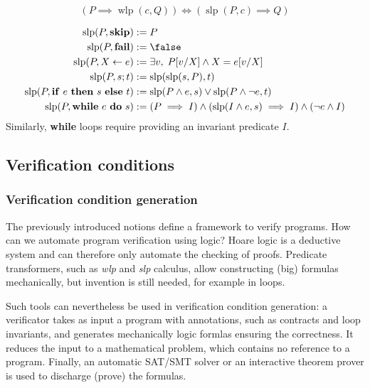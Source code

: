 \documentclass[toc]{../cs-classes/cs-classes}
\DeclareMathOperator{\wlp}{wlp}
\DeclareMathOperator{\slp}{slp}
\begin{document}
\begin{property}[Duality]
    \begin{equation*}
        (P\implies\wlp(c, Q)) \iff (\slp(P, c) \implies Q)
    \end{equation*}
\end{property}

\begin{definition}
    \begin{equation*}
        \begin{aligned}
            \slp(P, \textnormal{\bf skip}) &:= P\\
            \slp(P, \textnormal{\bf fail}) &:= \false\\
            \slp(P, X\leftarrow e) &:= \exists v, \; P[v/X] \land X=e[v/X]\\
            \slp(P, s;t) &:= \slp(\slp(s, P), t)\\
            \slp(P, \textnormal{\textbf{if} $e$ \textbf{then} $s$ \textbf{else} $t$}) &:= \slp(P\land e, s)\lor\slp(P\land\lnot e, t)\\
            \slp(P, \textnormal{\textbf{while} $e$ \textbf{do} $s$}) &:= (P\implies I)\land(\slp(I\land e, s) \implies I) \land (\lnot e\land I)
        \end{aligned}
    \end{equation*}
    Similarly, \textbf{while} loops require providing an invariant predicate $I$. 
\end{definition}

\subsection{Verification conditions}
\subsubsection{Verification condition generation}
The previously introduced notions define a framework to verify programs. How can we automate program verification using logic? Hoare logic is a deductive system and can therefore only automate the checking of proofs. Predicate transformers, such as \emph{wlp} and \emph{slp} calculus, allow constructing (big) formulas mechanically, but invention is still needed, for example in loops.

Such tools can nevertheless be used in verification condition generation: a verificator takes as input a program with annotations, such as contracts and loop invariants, and generates mechanically logic formlas ensuring the correctness. It reduces the input to a mathematical problem, which contains no reference to a program. Finally, an automatic SAT/SMT solver or an interactive theorem prover is used to discharge (prove) the formulas.
\end{document}
